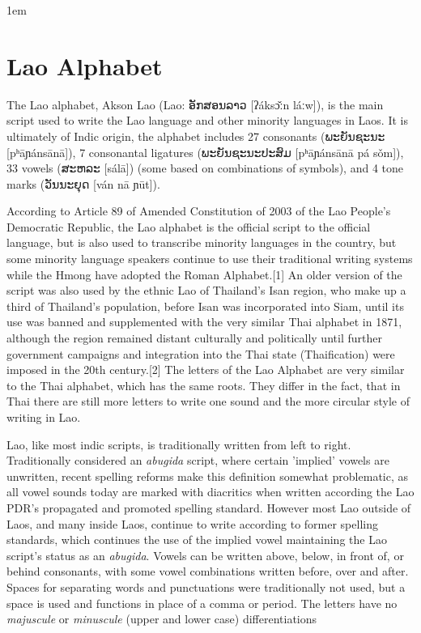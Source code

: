 \parindent1em
\section{Lao Alphabet}

\def\laotext#1{{\lao#1}}

The Lao alphabet, Akson Lao (Lao: \laotext{ອັກສອນລາວ} [ʔáksɔ̌ːn láːw]), is the main script used to write the Lao language and other minority languages in Laos. It is ultimately of Indic origin, the alphabet includes 27 consonants (\laotext{ພະຍັນຊະນະ} [pʰāɲánsānā]), 7 consonantal ligatures (\laotext{ພະຍັນຊະນະປະສົມ} [pʰāɲánsānā pá sǒm]), 33 vowels (\laotext{ສະຫລະ} [sálā]) (some based on combinations of symbols), and 4 tone marks (\laotext{ວັນນະຍຸດ} [ván nā ɲūt]). 



According to Article 89 of Amended Constitution of 2003 of the Lao People's Democratic Republic, the Lao alphabet is the official script to the official language, but is also used to transcribe minority languages in the country, but some minority language speakers continue to use their traditional writing systems while the Hmong have adopted the Roman Alphabet.[1] An older version of the script was also used by the ethnic Lao of Thailand's Isan region, who make up a third of Thailand's population, before Isan was incorporated into Siam, until its use was banned and supplemented with the very similar Thai alphabet in 1871, although the region remained distant culturally and politically until further government campaigns and integration into the Thai state (Thaification) were imposed in the 20th century.[2] The letters of the Lao Alphabet are very similar to the Thai alphabet, which has the same roots. They differ in the fact, that in Thai there are still more letters to write one sound and the more circular style of writing in Lao.

Lao, like most indic scripts, is traditionally written from left to right. Traditionally considered an \emph{abugida} script, where certain 'implied' vowels are unwritten, recent spelling reforms make this definition somewhat problematic, as all vowel sounds today are marked with diacritics when written according the Lao PDR's propagated and promoted spelling standard. However most Lao outside of Laos, and many inside Laos, continue to write according to former spelling standards, which continues the use of the implied vowel maintaining the Lao script's status as an \emph{abugida}. Vowels can be written above, below, in front of, or behind consonants, with some vowel combinations written before, over and after. Spaces for separating words and punctuations were traditionally not used, but a space is used and functions in place of a comma or period. The letters have no \emph{majuscule} or \emph{minuscule} (upper and lower case) differentiations

